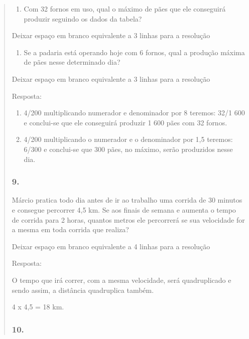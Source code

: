\begin{enumerate}
\begin{escolha}
\begin{enumerate}
\begin{itemize}
\begin{itemize}
\begin{escolha}
\begin{quote}
\begin{escolha}
{\begin{enumerate}
\def\labelenumi{\alph{enumi})}
\item
  Com 32 fornos em uso, qual o máximo de pães que ele conseguirá
  produzir seguindo os dados da tabela?
\end{enumerate}

Deixar espaço em branco equivalente a 3 linhas para a resolução

\begin{enumerate}
\def\labelenumi{\alph{enumi})}
\item
  Se a padaria está operando hoje com 6 fornos, qual a produção máxima
  de pães nesse determinado dia?
\end{enumerate}

Deixar espaço em branco equivalente a 3 linhas para a resolução

Resposta:

\begin{enumerate}
\def\labelenumi{\alph{enumi})}
\item
  4/200 multiplicando numerador e denominador por 8 teremos: 32/1 600 e
  conclui-se que ele conseguirá produzir 1 600 pães com 32 fornos.
\item
  4/200 multiplicando o numerador e o denominador por 1,5 teremos: 6/300
  e conclui-se que 300 pães, no máximo, serão produzidos nesse dia.
\end{enumerate}

\subsubsection{9.}\label{section-125}

Márcio pratica todo dia antes de ir ao trabalho uma corrida de 30
minutos e consegue percorrer 4,5 km. Se aos finais de semana e aumenta o
tempo de corrida para 2 horas, quantos metros ele percorrerá se sua
velocidade for a mesma em toda corrida que realiza?

Deixar espaço em branco equivalente a 4 linhas para a resolução

Resposta:

O tempo que irá correr, com a mesma velocidade, será quadruplicado e
sendo assim, a distância quadruplica também.

4 x 4,5 = 18 km.

\subsubsection{10.}\label{section-126}

}
\end{escolha}
\end{quote}
\end{escolha}
\end{itemize}
\end{itemize}
\end{enumerate}
\end{escolha}
\end{enumerate}
